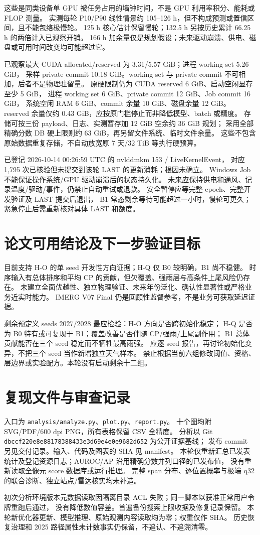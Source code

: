 \documentclass[UTF8,fontset=windows,10pt,a4paper]{ctexart}
\begin{document}
这些是同类设备单 GPU 被任务占用的墙钟时间，不是 GPU 利用率积分、能耗或 FLOP 测量。
实测每轮 P10/P90 线性情景约 105--126 h，但不构成预测或置信区间，且不能包络极慢轮。
125 h 核心估计保留慢轮；132.5 h 另按历史累计 66.25 h 的两倍计入已观察开销。
166 h 加余量仅是规划假设；未来驱动崩溃、供电、磁盘或可用时间改变均可能超过它。

已观察最大 CUDA allocated/reserved 为 3.31/5.57 GiB；进程 working set 5.26 GiB，
采样 private commit 10.18 GiB。working set 与 private commit 不可相加，后者不是物理驻留量。
原硬限制仍为 CUDA reserved 6 GiB、启动空闲显存至少 5 GiB，
进程 working set 6 GiB、private commit 12 GiB、Job commit 16 GiB，
系统空闲 RAM 6 GiB、commit 余量 10 GiB、磁盘余量 12 GiB。
reserved 余量仅约 0.43 GiB，应按原门槛停止而非降低模型、batch 或精度。
存储可按三份 payload、日志、实测暂存加 12 GiB 空余约 36 GiB 规划；
采用全部精确分数 DB 硬上限则约 63 GiB，再另留文件系统、临时文件余量。
这些不包含原始数据重复存储，不自动放宽原 7 天/32 TiB 等执行硬预算。

已登记 2026-10-14 00:26:59 UTC 的 nvlddmkm 153 / LiveKernelEvent，
对应 1,795 次已核验但未提交到该轮 LAST 的更新消耗；根因未确立。
Windows Job 不能保证操作系统/GPU 驱动崩溃后的状态持久化。
未来应保持供电和通风、记录温度/驱动/事件，仍禁止自动重试或退款。
安全暂停应等完整 epoch、完整开发验证及 LAST 提交后退出，
B1 常态剩余等待可能超过一小时，慢轮可更久；紧急停止后需重新核对具体 LAST 和额度。

\section{论文可用结论及下一步验证目标}
目前支持 H-O 的单 seed 开发性方向证据；H-Q 仅 B0 较明确，B1 尚不稳健。
时序输入有总体排序和平均 CP 的贡献，但欠覆盖、强雨层与高条件上尾风险仍存在。
未建立全面优越性、独立物理验证、未来年份泛化、确认性显著性或严格业务近实时能力。
IMERG V07 Final 仍是回顾性监督参考，不是业务可获取延迟证据。

剩余预定义 seeds 2027/2028 最应检验：H-O 方向是否跨初始化稳定；
H-Q 是否为 B0 特有或可复现于 B1；覆盖改善是否伴随 CP/强雨/上尾副作用；
B1 总体贡献能否在三个 seed 稳定而不牺牲最高雨强。
应逐 seed 报告，再讨论初始化变异，不把三个 seed 当作新增独立天气样本。
禁止根据当前六组修改阈值、资格、层边界或实验配方。本轮没有启动剩余十二组。

\section{复现文件与审查记录}
入口为 \texttt{analysis/analyze.py}、\texttt{plot.py}、\texttt{report.py}。
十个图均附 SVG/PDF/600 dpi PNG，所有表格保留 CSV 全精度。
分析以 Git \texttt{dbccf220e8e88178388433e3d69e4e0e9682d652} 为公开证据基线；
发布 commit 另见交付记录。输入、代码及图表的 SHA 见 manifest。
本轮仅重新汇总已发表统计及登记资源日志；AUROC/AP 沿用精确分数并列口径的已发布值，
没有重新读取全像元 score 数据库或运行推理。
完整 span 分布、逐位置概率与极端 q32 的联合诊断、独立站点/雷达核实均未补造。

初次分析环境版本元数据读取因隔离目录 ACL 失败；同一脚本以获准正常用户令牌重跑后通过，
没有降低数值容差。首遍备份搜索上限收据及修复记录保留。
本轮新优化器更新、模型推理、原始观测内容读取均为零；权重仅作 SHA。
历史恢复治理和 2025 路径属性未计数事实仍保留，不追认、不追溯清零。
\end{document}
